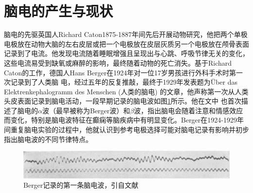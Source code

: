 \thesischapterexordium
\section{脑电的产生与现状}
脑电的先驱英国人Richard Caton1875-1887年间先后开展动物研究，他把两个单极电极放在动物大脑的左右皮层或把一个电极放在皮层灰质另一个电极放在颅骨表面记录到了电流。他发现电流随着睡眠增强且呈现出与心跳、呼吸节律无关的变化，这些电流易受到缺氧或麻醉的影响，最终随着动物的死亡消失。基于Richard Caton的工作，德国人Hans Berger在1924年对一位17岁男孩进行外科手术时第一次记录到了人类脑
电，经过五年的反复推敲，最终于1929年发表题为Über das Elektrenkephalogramm des Menschen (人类的脑电) 的文章，他声称第一次从人类头皮表面记录到脑电活动，一段早期记录的脑电波如图\ref{wave}所示。他在文中
也首次描述了脑电的$\alpha$波（最早被称为Berger波）和$\beta$波，指出脑电会随着注意和情感效应而变化，特别是脑电波特征在癫痫等脑疾病中有明显变化。Berger在1924-1929年间重复脑电实验的过程中，他就认识到参考电极选择可能对脑电记录有影响并初步指出脑电波的不同节律特点。
\begin{figure}[!h]
	\includegraphics[width=13cm]{pic/xulun/EEGwave.png}
	\caption{Berger记录的第一条脑电波，引自文献}
	\label{wave}
\end{figure}

